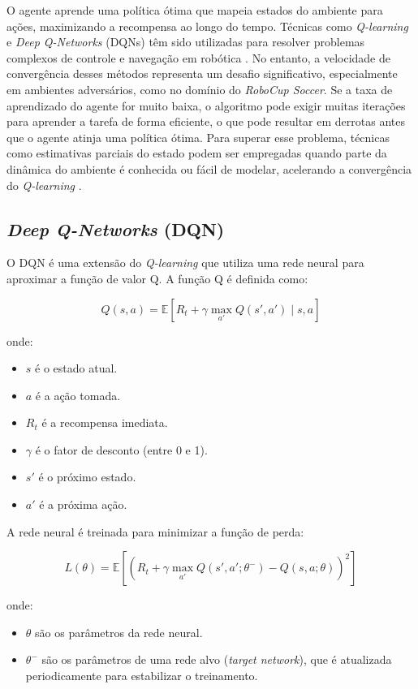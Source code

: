 O agente aprende uma política ótima que mapeia estados do ambiente para ações, maximizando a recompensa ao longo do tempo. Técnicas como \textit{Q-learning} e \textit{Deep Q-Networks} (DQNs) têm sido utilizadas para resolver problemas complexos de controle e navegação em robótica \cite{Kober2013}. No entanto, a velocidade de convergência desses métodos representa um desafio significativo, especialmente em ambientes adversários, como no domínio do \textit{RoboCup Soccer}. Se a taxa de aprendizado do agente for muito baixa, o algoritmo pode exigir muitas iterações para aprender a tarefa de forma eficiente, o que pode resultar em derrotas antes que o agente atinja uma política ótima. Para superar esse problema, técnicas como estimativas parciais do estado podem ser empregadas quando parte da dinâmica do ambiente é conhecida ou fácil de modelar, acelerando a convergência do \textit{Q-learning} \cite{Ahumada2013}.

\subsection{\textit{Deep Q-Networks} (DQN)}

O DQN é uma extensão do \textit{Q-learning} que utiliza uma rede neural para aproximar a função de valor Q. A função Q é definida como:

\[
Q(s, a) = \mathbb{E}\left[ R_t + \gamma \max_{a'} Q(s', a') \mid s, a \right]
\]

onde:
\begin{itemize}
    \item \( s \) é o estado atual.
    \item \( a \) é a ação tomada.
    \item \( R_t \) é a recompensa imediata.
    \item \( \gamma \) é o fator de desconto (entre 0 e 1).
    \item \( s' \) é o próximo estado.
    \item \( a' \) é a próxima ação.
\end{itemize}

A rede neural é treinada para minimizar a função de perda:

\[
L(\theta) = \mathbb{E}\left[ \left( R_t + \gamma \max_{a'} Q(s', a'; \theta^-) - Q(s, a; \theta) \right)^2 \right]
\]

onde:
\begin{itemize}
    \item \( \theta \) são os parâmetros da rede neural.
    \item \( \theta^- \) são os parâmetros de uma rede alvo (\textit{target network}), que é atualizada periodicamente para estabilizar o treinamento.
\end{itemize}

